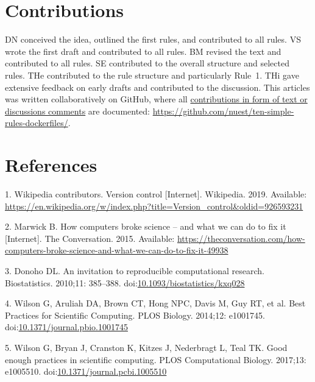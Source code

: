 \documentclass[10pt,letterpaper]{article}
\begin{document}
\hypertarget{contributions}{%
\section*{Contributions}\label{contributions}}

DN conceived the idea, outlined the first rules, and contributed to all
rules. VS wrote the first draft and contributed to all rules. BM revised
the text and contributed to all rules. SE contributed to the overall
structure and selected rules. THe contributed to the rule structure and
particularly Rule~1. THi gave extensive feedback on early drafts and
contributed to the discussion. This articles was written collaboratively
on GitHub, where all
\href{https://github.com/nuest/ten-simple-rules-dockerfiles/graphs/contributors}{contributions
in form of text or discussions comments} are documented:
\url{https://github.com/nuest/ten-simple-rules-dockerfiles/}.

\hypertarget{references}{%
\section*{References}\label{references}}

\hypertarget{refs}{}
\leavevmode\hypertarget{ref-wikipedia_contributors_version_2019}{}%
1. Wikipedia contributors. Version control {[}Internet{]}. Wikipedia.
2019. Available:
\url{https://en.wikipedia.org/w/index.php?title=Version_control\&oldid=926593231}

\leavevmode\hypertarget{ref-marwick_how_2015}{}%
2. Marwick B. How computers broke science -- and what we can do to fix
it {[}Internet{]}. The Conversation. 2015. Available:
\url{https://theconversation.com/how-computers-broke-science-and-what-we-can-do-to-fix-it-49938}

\leavevmode\hypertarget{ref-donoho_invitation_2010}{}%
3. Donoho DL. An invitation to reproducible computational research.
Biostatistics. 2010;11: 385--388.
doi:\href{https://doi.org/10.1093/biostatistics/kxq028}{10.1093/biostatistics/kxq028}

\leavevmode\hypertarget{ref-wilson_best_2014}{}%
4. Wilson G, Aruliah DA, Brown CT, Hong NPC, Davis M, Guy RT, et al.
Best Practices for Scientific Computing. PLOS Biology. 2014;12:
e1001745.
doi:\href{https://doi.org/10.1371/journal.pbio.1001745}{10.1371/journal.pbio.1001745}

\leavevmode\hypertarget{ref-wilson_good_2017}{}%
5. Wilson G, Bryan J, Cranston K, Kitzes J, Nederbragt L, Teal TK. Good
enough practices in scientific computing. PLOS Computational Biology.
2017;13: e1005510.
doi:\href{https://doi.org/10.1371/journal.pcbi.1005510}{10.1371/journal.pcbi.1005510}
\end{document}
